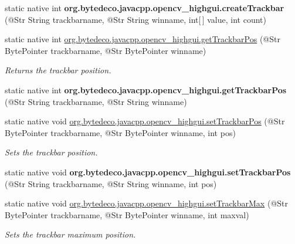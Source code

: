 \begin{DoxyCompactItemize}
\item 
\mbox{\label{group__highgui_gabff60622e60e3ebd873277db5aff5501}} 
static native int {\bfseries org.\+bytedeco.\+javacpp.\+opencv\+\_\+highgui.\+create\+Trackbar} (@Str String trackbarname, @Str String winname, int\mbox{[}$\,$\mbox{]} value, int count)
\item 
static native int \hyperlink{group__highgui_gad91f649b98c33cbfdbf3c995935facdc}{org.\+bytedeco.\+javacpp.\+opencv\+\_\+highgui.\+get\+Trackbar\+Pos} (@Str Byte\+Pointer trackbarname, @Str Byte\+Pointer winname)
\begin{DoxyCompactList}\small\item\em Returns the trackbar position. \end{DoxyCompactList}\item 
\mbox{\label{group__highgui_ga718b4a954ab80d53a30d3d9780a63f4b}} 
static native int {\bfseries org.\+bytedeco.\+javacpp.\+opencv\+\_\+highgui.\+get\+Trackbar\+Pos} (@Str String trackbarname, @Str String winname)
\item 
static native void \hyperlink{group__highgui_ga53b09172763cf63873f5ac01fef0154d}{org.\+bytedeco.\+javacpp.\+opencv\+\_\+highgui.\+set\+Trackbar\+Pos} (@Str Byte\+Pointer trackbarname, @Str Byte\+Pointer winname, int pos)
\begin{DoxyCompactList}\small\item\em Sets the trackbar position. \end{DoxyCompactList}\item 
\mbox{\label{group__highgui_ga03572f946805f6f78eb6c13999a6a4d1}} 
static native void {\bfseries org.\+bytedeco.\+javacpp.\+opencv\+\_\+highgui.\+set\+Trackbar\+Pos} (@Str String trackbarname, @Str String winname, int pos)
\item 
static native void \hyperlink{group__highgui_ga7f8973f0842fd2c01aad396250da751a}{org.\+bytedeco.\+javacpp.\+opencv\+\_\+highgui.\+set\+Trackbar\+Max} (@Str Byte\+Pointer trackbarname, @Str Byte\+Pointer winname, int maxval)
\begin{DoxyCompactList}\small\item\em Sets the trackbar maximum position. \end{DoxyCompactList}\item 
\mbox{\label{group__highgui_ga07ec99934bd3e81d729b67589d50078f}} 

\end{DoxyCompactItemize}
